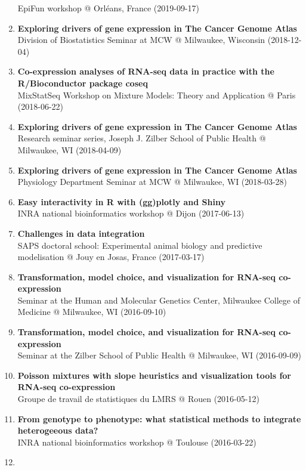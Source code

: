 \documentclass[11pt, a4paper]{awesome-cv}
\begin{document}
\begin{enumerate}
  EpiFun workshop @ Orléans, France (2019-09-17)
\item
  \textbf{Exploring drivers of gene expression in The Cancer Genome
  Atlas}\\
  Division of Biostatistics Seminar at MCW @ Milwaukee, Wisconsin
  (2018-12-04)
\item
  \textbf{Co-expression analyses of RNA-seq data in practice with the
  R/Bioconductor package coseq}\\
  MixStatSeq Workshop on Mixture Models: Theory and Application @ Paris
  (2018-06-22)
\item
  \textbf{Exploring drivers of gene expression in The Cancer Genome
  Atlas}\\
  Research seminar series, Joseph J. Zilber School of Public Health @
  Milwaukee, WI (2018-04-09)
\item
  \textbf{Exploring drivers of gene expression in The Cancer Genome
  Atlas}\\
  Physiology Department Seminar at MCW @ Milwaukee, WI (2018-03-28)
\item
  \textbf{Easy interactivity in R with (gg)plotly and Shiny}\\
  INRA national bioinformatics workshop @ Dijon (2017-06-13)
\item
  \textbf{Challenges in data integration}\\
  SAPS doctoral school: Experimental animal biology and predictive
  modelisation @ Jouy en Josas, France (2017-03-17)
\item
  \textbf{Transformation, model choice, and visualization for RNA-seq
  co-expression}\\
  Seminar at the Human and Molecular Genetics Center, Milwaukee College
  of Medicine @ Milwaukee, WI (2016-09-10)
\item
  \textbf{Transformation, model choice, and visualization for RNA-seq
  co-expression}\\
  Seminar at the Zilber School of Public Health @ Milwaukee, WI
  (2016-09-09)
\item
  \textbf{Poisson mixtures with slope heuristics and visualization tools
  for RNA-seq co-expression}\\
  Groupe de travail de statistiques du LMRS @ Rouen (2016-05-12)
\item
  \textbf{From genotype to phenotype: what statistical methods to
  integrate heterogeeous data?}\\
  INRA national bioinformatics workshop @ Toulouse (2016-03-22)
\item

\end{enumerate}
\end{document}
